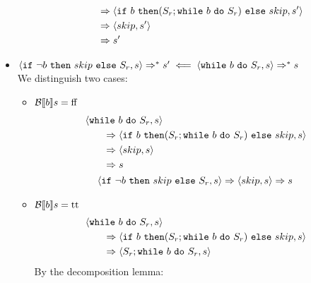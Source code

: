 \begin{exercise}
\begin{itemize}
\begin{itemize}
\begin{align*}
                    \\&\qquad\Rightarrow \instr{\texttt{if}\ b\ \texttt{then} (S_r; \texttt{while}\ b\ \texttt{do}\ S_r)\ \texttt{else}\ skip}{s'}
                    \\&\qquad\Rightarrow \instr{skip}{s'}
                    \\&\qquad\Rightarrow s'
                \end{align*}
            \end{itemize}
        \item $\instr{\texttt{if}\ \neg b\ \texttt{then}\ skip\ \texttt{else}\ S_r}{s} \Rightarrow^* s' \impliedby \instr{\texttt{while}\ b\ \texttt{do}\ S_r}{s} \Rightarrow^* s$ \\
            We distinguish two cases:\begin{itemize}
                \item $\mathcal{B} \llbracket  b \rrbracket s = \text{ff}$
                \begin{gather*}
                    \begin{align*}
                        &\instr{\texttt{while}\ b\ \texttt{do}\ S_r}{s}
                        \\&\qquad\Rightarrow \instr{\texttt{if}\ b\ \texttt{then} (S_r; \texttt{while}\ b\ \texttt{do}\ S_r)\ \texttt{else}\ skip}{s}
                        \\&\qquad\Rightarrow \instr{skip}{s}
                        \\&\qquad\Rightarrow s
                    \end{align*}
                    \\
                    \instr{\texttt{if}\ \neg b\ \texttt{then}\ skip\ \texttt{else}\ S_r}{s}
                    \Rightarrow
                    \instr{skip}{s}
                    \Rightarrow s
                \end{gather*}
                \item $\mathcal{B} \llbracket  b \rrbracket s = \text{tt}$
                \begin{align*}
                    &\instr{\texttt{while}\ b\ \texttt{do}\ S_r}{s}
                    \\&\qquad\Rightarrow \instr{\texttt{if}\ b\ \texttt{then} (S_r; \texttt{while}\ b\ \texttt{do}\ S_r)\ \texttt{else}\ skip}{s}
                    \\&\qquad\Rightarrow \instr{S_r; \texttt{while}\ b\ \texttt{do}\ S_r}{s}
                \end{align*}
                By the decomposition lemma:

\end{itemize}
\end{itemize}
\end{exercise}
